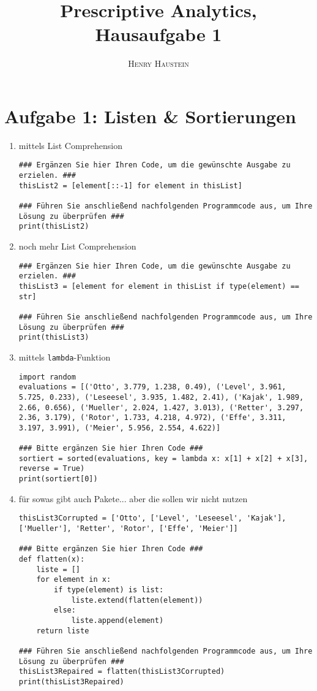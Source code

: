 \documentclass{article}
\title{\textbf{Prescriptive Analytics, Hausaufgabe 1}}
\author{\textsc{Henry Haustein}}
\date{}
\begin{document}
	\maketitle
	
	\section*{Aufgabe 1: Listen \& Sortierungen}
	\begin{enumerate}[label=(\alph*)]
		\item mittels List Comprehension
		\begin{lstlisting}
### Ergänzen Sie hier Ihren Code, um die gewünschte Ausgabe zu erzielen. ###
thisList2 = [element[::-1] for element in thisList]

### Führen Sie anschließend nachfolgenden Programmcode aus, um Ihre Lösung zu überprüfen ###
print(thisList2)
		\end{lstlisting}
		\item noch mehr List Comprehension
		\begin{lstlisting}
### Ergänzen Sie hier Ihren Code, um die gewünschte Ausgabe zu erzielen. ###
thisList3 = [element for element in thisList if type(element) == str]

### Führen Sie anschließend nachfolgenden Programmcode aus, um Ihre Lösung zu überprüfen ###
print(thisList3)
		\end{lstlisting}
		\item mittels \texttt{lambda}-Funktion
		\begin{lstlisting}
import random
evaluations = [('Otto', 3.779, 1.238, 0.49), ('Level', 3.961, 5.725, 0.233), ('Leseesel', 3.935, 1.482, 2.41), ('Kajak', 1.989, 2.66, 0.656), ('Mueller', 2.024, 1.427, 3.013), ('Retter', 3.297, 2.36, 3.179), ('Rotor', 1.733, 4.218, 4.972), ('Effe', 3.311, 3.197, 3.991), ('Meier', 5.956, 2.554, 4.622)]

### Bitte ergänzen Sie hier Ihren Code ###
sortiert = sorted(evaluations, key = lambda x: x[1] + x[2] + x[3], reverse = True)
print(sortiert[0])
		\end{lstlisting}
		\item für sowas gibt auch Pakete... aber die sollen wir nicht nutzen
		\begin{lstlisting}
thisList3Corrupted = ['Otto', ['Level', 'Leseesel', 'Kajak'], ['Mueller'], 'Retter', 'Rotor', ['Effe', 'Meier']]

### Bitte ergänzen Sie hier Ihren Code ###
def flatten(x):
	liste = []
	for element in x:
		if type(element) is list:
			liste.extend(flatten(element))
		else:
			liste.append(element)
	return liste

### Führen Sie anschließend nachfolgenden Programmcode aus, um Ihre Lösung zu überprüfen ###
thisList3Repaired = flatten(thisList3Corrupted)
print(thisList3Repaired)
		\end{lstlisting}
	\end{enumerate}
\end{document}
